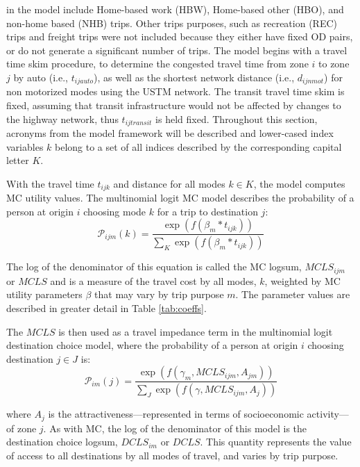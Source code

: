in the model include Home-based work (HBW), Home-based other (HBO),
and non-home based (NHB) trips. Other trips purposes, such as recreation (REC) trips and freight trips were not included because they either have fixed OD pairs, or do not generate a significant number of trips.
The model begins with a
travel time skim procedure, to determine the congested travel time from zone
\(i\) to zone \(j\) by auto (i.e., \(t_{ijauto}\)), as well as the shortest network distance (i.e., \(d_{ijnmot}\)) for non
motorized modes using the USTM network. The transit travel time skim is fixed, assuming that transit
infrastructure would not be affected by changes to the highway network, thus \(t_{ijtransit}\) is held fixed.
Throughout this section, acronyms from the model framework will be described and lower-cased index variables \(k\) belong to a set of
all indices described by the corresponding capital letter \(K\).

With the travel time \(t_{ijk}\) and distance for all modes \(k \in K\), the
model computes MC utility values. The multinomial logit MC
model describes the probability of a person at origin \(i\) choosing mode \(k\)
for a trip to destination \(j\):
\begin{equation}
\mathcal{P}_{ijm}(k) = \frac{\exp(f(\beta_m * t_{ijk}))}
{\sum_{K}\exp(f(\beta_m * t_{ijk}))}
  \label{eq:mcp}
\end{equation}

\noindent The log of the denominator of this equation is called the
MC logsum, \(MCLS_{ijm}\) or \(MCLS\) and is a measure of the travel cost by
all modes, $k$, weighted by MC utility parameters \(\beta\) that may vary by
trip purpose $m$. The parameter values are described in greater detail in
Table \ref{tab:coeffs}.

The \(MCLS\) is then used as a travel impedance term in the multinomial
logit
destination choice model, where the probability of a person at origin \(i\)
choosing destination \(j \in J\) is:
\begin{equation}
\mathcal{P}_{im}(j) = \frac{\exp(f(\gamma_m, MCLS_{ijm}, A_{jm}))}
{\sum_{J}\exp(f(\gamma, MCLS_{ijm}, A_j))}
  \label{eq:dcp}
\end{equation}

\noindent where \(A_j\) is the attractiveness---represented in terms of
socioeconomic activity---of zone \(j\). As with MC, the log of the
denominator of this model is the
destination choice logsum, \(DCLS_{im}\) or \(DCLS\). This quantity represents the value of access to
all destinations
by all modes of travel, and varies by trip purpose.

